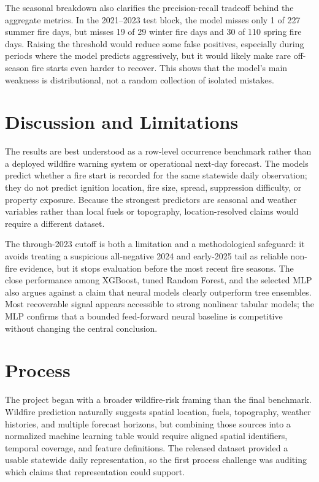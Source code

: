 \documentclass{article}
\begin{document}
The seasonal breakdown also clarifies the precision-recall tradeoff behind the aggregate metrics. In the 2021--2023 test block, the model misses only 1 of 227 summer fire days, but misses 19 of 29 winter fire days and 30 of 110 spring fire days. Raising the threshold would reduce some false positives, especially during periods where the model predicts aggressively, but it would likely make rare off-season fire starts even harder to recover. This shows that the model's main weakness is distributional, not a random collection of isolated mistakes.


\section{Discussion and Limitations}

The results are best understood as a row-level occurrence benchmark rather than a deployed wildfire warning system or operational next-day forecast. The models predict whether a fire start is recorded for the same statewide daily observation; they do not predict ignition location, fire size, spread, suppression difficulty, or property exposure. Because the strongest predictors are seasonal and weather variables rather than local fuels or topography, location-resolved claims would require a different dataset.

The through-2023 cutoff is both a limitation and a methodological safeguard: it avoids treating a suspicious all-negative 2024 and early-2025 tail as reliable non-fire evidence, but it stops evaluation before the most recent fire seasons. The close performance among XGBoost, tuned Random Forest, and the selected MLP also argues against a claim that neural models clearly outperform tree ensembles. Most recoverable signal appears accessible to strong nonlinear tabular models; the MLP confirms that a bounded feed-forward neural baseline is competitive without changing the central conclusion.


\section{Process}

The project began with a broader wildfire-risk framing than the final benchmark. Wildfire prediction naturally suggests spatial location, fuels, topography, weather histories, and multiple forecast horizons, but combining those sources into a normalized machine learning table would require aligned spatial identifiers, temporal coverage, and feature definitions. The released dataset provided a usable statewide daily representation, so the first process challenge was auditing which claims that representation could support.
\end{document}
